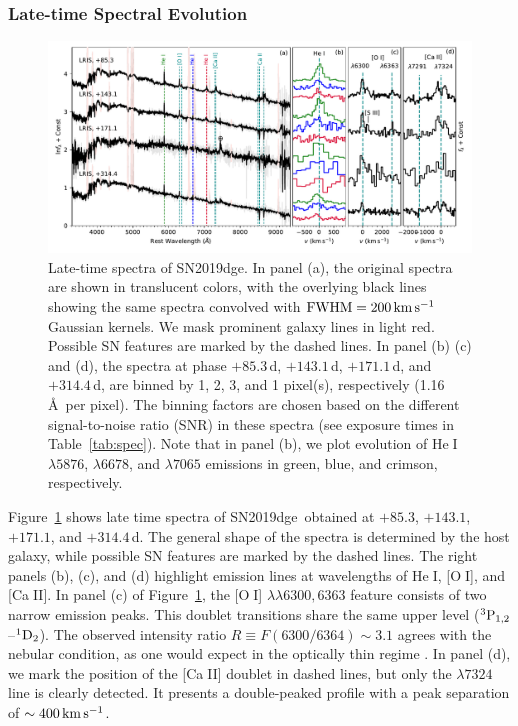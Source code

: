 \documentclass[twocolumn]{aastex63}
\newcommand{\name}{SN2019dge}
\def\ion#1#2{#1$\;${\footnotesize\rm{#2}}\relax}
\begin{document}
\subsubsection{Late-time  Spectral Evolution}
\begin{figure}[htbp!]
	\centering
	\includegraphics[width=\textwidth]{figures/spectra_late.pdf}
	\caption{Late-time spectra of \name. In panel (a), the original spectra are	
		shown in translucent colors, with the overlying black 
		lines showing the same spectra convolved with ${\rm FWHM} = 200\, {\rm km\, 
			s^{-1}}$ Gaussian kernels. We mask prominent galaxy lines in light red. Possible SN features are 
		marked by the dashed lines. In panel (b) (c) and (d), 
		the spectra at phase $+85.3$\,d, $+143.1$\,d, $+171.1$\,d, and $+314.4$\,d, are 
		binned by 1, 2, 3, and 1 pixel(s), respectively (1.16\,\AA\ per pixel). The binning 
		factors are chosen based on the 
		different signal-to-noise ratio (SNR) in these spectra (see exposure times in 
		Table~\ref{tab:spec}). Note that in panel (b), we plot evolution of \ion{He}{I} $\lambda 5876$, 
		$\lambda 6678$, and $\lambda 7065$ emissions in green, blue, and crimson, respectively.
		\label{fig:spectra_late}}
\end{figure}
Figure~\ref{fig:spectra_late} shows late time spectra of \name\ obtained at $+85.3$, 
$+143.1$, $+171.1$, and $+314.4$\,d.  The general shape of the spectra is determined by the host 
galaxy, while possible SN features are marked by the dashed lines. The right panels (b), (c), and (d) 
highlight emission lines at wavelengths of \ion{He}{I}, [\ion{O}{I}], and [\ion{Ca}{II}]. In panel (c) of 
Figure~\ref{fig:spectra_late}, the [\ion{O}{I}] $\lambda \lambda 6300, 6363$ feature 
consists of two narrow emission peaks. This doublet transitions share the same upper level ($\rm 
^{3}P_{1,2}$--$\rm ^{1}D_2$). The observed intensity ratio $R \equiv F(6300/6364) \sim 3.1$ agrees 
with the nebular condition, as one would expect in the optically thin regime \citep{Leibundgut1991, 
Li1992}. In panel (d), we mark the position of the [\ion{Ca}{II}] doublet in dashed lines, but only the 
$\lambda 7324$ line is clearly detected. It presents a double-peaked profile with a peak separation of 
$\sim 400\,{\rm km\,s^{-1}}$. 
\end{document}
